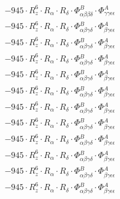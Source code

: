 \documentclass{article}
\begin{document}
\begin{subequations}
\begin{gather}
\begin{array}{c}
 \\[0.2em] 		 - 945 \cdot R_{z}^{6} \cdot R_{\alpha{}} \cdot R_{\delta{}} \cdot \Phi{}^{B}_{\alpha{}\beta{}\beta{}\delta{}} \cdot \Phi{}^{A}_{\gamma{}\gamma{}\epsilon{}\epsilon{}} 
 \\[0.2em] 		 - 945 \cdot R_{z}^{6} \cdot R_{\alpha{}} \cdot R_{\delta{}} \cdot \Phi{}^{B}_{\alpha{}\beta{}\gamma{}\delta{}} \cdot \Phi{}^{A}_{\beta{}\gamma{}\epsilon{}\epsilon{}} 
 \\[0.2em] 		 - 945 \cdot R_{z}^{6} \cdot R_{\alpha{}} \cdot R_{\delta{}} \cdot \Phi{}^{B}_{\alpha{}\beta{}\gamma{}\delta{}} \cdot \Phi{}^{A}_{\beta{}\gamma{}\epsilon{}\epsilon{}} 
 \\[0.2em] 		 - 945 \cdot R_{z}^{6} \cdot R_{\alpha{}} \cdot R_{\delta{}} \cdot \Phi{}^{B}_{\alpha{}\beta{}\gamma{}\delta{}} \cdot \Phi{}^{A}_{\beta{}\gamma{}\epsilon{}\epsilon{}} 
 \\[0.2em] 		 - 945 \cdot R_{z}^{6} \cdot R_{\alpha{}} \cdot R_{\delta{}} \cdot \Phi{}^{B}_{\alpha{}\beta{}\gamma{}\delta{}} \cdot \Phi{}^{A}_{\beta{}\gamma{}\epsilon{}\epsilon{}} 
 \\[0.2em] 		 - 945 \cdot R_{z}^{6} \cdot R_{\alpha{}} \cdot R_{\delta{}} \cdot \Phi{}^{B}_{\alpha{}\beta{}\gamma{}\delta{}} \cdot \Phi{}^{A}_{\beta{}\gamma{}\epsilon{}\epsilon{}} 
 \\[0.2em] 		 - 945 \cdot R_{z}^{6} \cdot R_{\alpha{}} \cdot R_{\delta{}} \cdot \Phi{}^{B}_{\alpha{}\beta{}\gamma{}\delta{}} \cdot \Phi{}^{A}_{\beta{}\gamma{}\epsilon{}\epsilon{}} 
 \\[0.2em] 		 - 945 \cdot R_{z}^{6} \cdot R_{\alpha{}} \cdot R_{\delta{}} \cdot \Phi{}^{B}_{\alpha{}\beta{}\gamma{}\delta{}} \cdot \Phi{}^{A}_{\beta{}\gamma{}\epsilon{}\epsilon{}} 
 \\[0.2em] 		 - 945 \cdot R_{z}^{6} \cdot R_{\alpha{}} \cdot R_{\delta{}} \cdot \Phi{}^{B}_{\alpha{}\beta{}\gamma{}\delta{}} \cdot \Phi{}^{A}_{\beta{}\gamma{}\epsilon{}\epsilon{}} 
 \\[0.2em] 		 - 945 \cdot R_{z}^{6} \cdot R_{\alpha{}} \cdot R_{\delta{}} \cdot \Phi{}^{B}_{\alpha{}\beta{}\gamma{}\delta{}} \cdot \Phi{}^{A}_{\beta{}\gamma{}\epsilon{}\epsilon{}} 
 \\[0.2em] 		 - 945 \cdot R_{z}^{6} \cdot R_{\alpha{}} \cdot R_{\delta{}} \cdot \Phi{}^{B}_{\alpha{}\beta{}\gamma{}\delta{}} \cdot \Phi{}^{A}_{\beta{}\gamma{}\epsilon{}\epsilon{}} 
 \\[0.2em] 		 - 945 \cdot R_{z}^{6} \cdot R_{\alpha{}} \cdot R_{\delta{}} \cdot \Phi{}^{B}_{\alpha{}\beta{}\gamma{}\delta{}} \cdot \Phi{}^{A}_{\beta{}\gamma{}\epsilon{}\epsilon{}} 

\end{array}
\end{gather}
\end{subequations}
\end{document}
